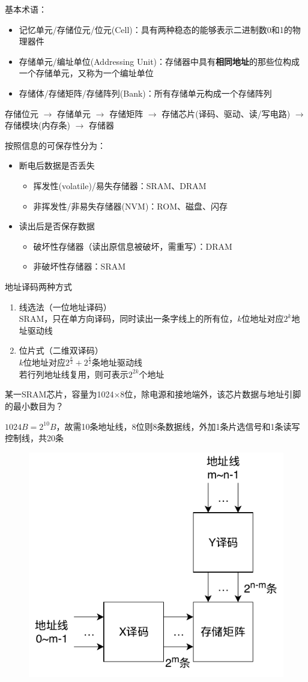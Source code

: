 基本术语：
\begin{itemize}
	\item 记忆单元/存储位元/位元(Cell)：具有两种稳态的能够表示二进制数0和1的物理器件
	\item 存储单元/编址单位(Addressing Unit)：存储器中具有\textbf{相同地址}的那些位构成一个存储单元，又称为一个编址单位
	\item 存储体/存储矩阵/存储阵列(Bank)：所有存储单元构成一个存储阵列
\end{itemize}
\begin{center}
存储位元 $\to$ 存储单元 $\to$ 存储矩阵 $\to$ 存储芯片(译码、驱动、读/写电路) $\to$ 存储模块(内存条) $\to$ 存储器
\end{center}
按照信息的可保存性分为：
\begin{itemize}
	\item 断电后数据是否丢失
	\begin{itemize}
		\item 挥发性(volatile)/易失存储器：SRAM、DRAM
		\item 非挥发性/非易失存储器(NVM)：ROM、磁盘、闪存
	\end{itemize}
	\item 读出后是否保存数据
	\begin{itemize}
		\item 破坏性存储器（读出原信息被破坏，需重写）：DRAM
		\item 非破坏性存储器：SRAM
	\end{itemize}
\end{itemize}
地址译码两种方式
\begin{enumerate}
	\item 线选法（一位地址译码）\\
	SRAM，只在单方向译码，同时读出一条字线上的所有位，$k$位地址对应$2^k$地址驱动线
	\item 位片式（二维双译码）\\
	$k$位地址对应$2^\frac{k}{2}+2^\frac{k}{2}$条地址驱动线\\
	若行列地址线复用，则可表示$2^{2k}$个地址
\end{enumerate}
\begin{example}
某一SRAM芯片，容量为1024$\times$8位，除电源和接地端外，该芯片数据与地址引脚的最小数目为？
\end{example}
\begin{analysis}
$1024B=2^{10}B$，故需10条地址线，8位则8条数据线，外加1条片选信号和1条读写控制线，共20条
\end{analysis}
\begin{figure}[H]
\centering
\includegraphics[width=0.4\linewidth]{fig/Memory-Double_Decode.pdf}
\end{figure}
